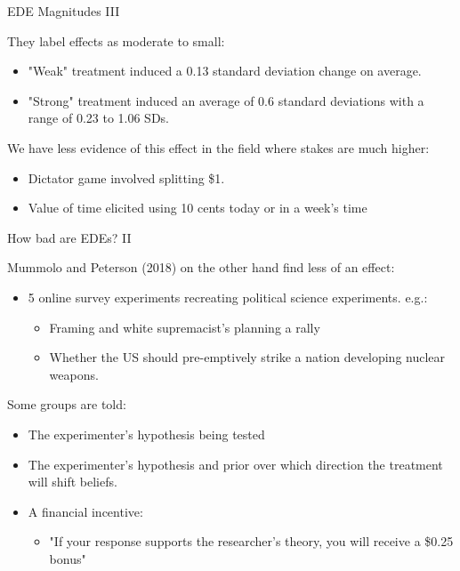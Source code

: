 \documentclass[aspectratio=169,xcolor=dvipsnames]{beamer}
\begin{document}
\begin{frame}{EDE Magnitudes III}

    They label effects as moderate to small:
    
    \begin{itemize}
        \item  "Weak" treatment induced a 0.13 standard deviation change on average.
        \item "Strong" treatment induced an average of 0.6 standard deviations with a 
        range of 0.23 to 1.06 SDs.
    \end{itemize}



    We have less evidence of this effect in the field where stakes are much 
    higher:

    \begin{itemize}
        \item Dictator game involved splitting \$1.
        \item Value of time elicited using 10 cents today or in a week's time
    \end{itemize}
\end{frame}

\begin{frame}{How bad are EDEs? II}

    Mummolo and Peterson (2018) on the other hand find less of an effect:
    \begin{itemize}
        \item 5 online survey experiments recreating political science experiments. e.g.:
        \begin{itemize}
            \item Framing and white supremacist's planning a rally
            \item Whether the US should pre-emptively strike a nation developing nuclear weapons.
        \end{itemize}
    \end{itemize}      

    Some groups are told:
    \begin{itemize}
        \item The experimenter's hypothesis being tested
        \item The experimenter's hypothesis and prior over which direction the treatment will shift beliefs.
        \item A financial incentive: 
        \begin{itemize}
            \item "If your response supports the researcher's theory, you will receive a \$0.25 bonus"
        \end{itemize}    
    \end{itemize}

\end{frame}
\end{document}
